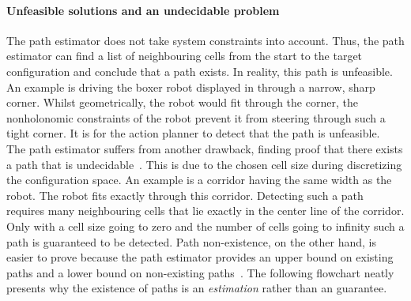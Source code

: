 \paragraph{Unfeasible solutions and an undecidable problem}
The path estimator does not take system constraints into account. Thus, the path estimator can find a list of neighbouring cells from the start to the target configuration and conclude that a path exists. In reality, this path is unfeasible. An example is driving the boxer robot displayed in  through a narrow, sharp corner. Whilst geometrically, the robot would fit through the corner, the nonholonomic constraints of the robot prevent it from steering through such a tight corner. It is for the action planner to detect that the path is unfeasible.\\

The path estimator suffers from another drawback, finding proof that there exists a path that is undecidable~\cite{zhang_simple_2008}. This is due to the chosen cell size during discretizing the configuration space. An example is a corridor having the same width as the robot. The robot fits exactly through this corridor. Detecting such a path requires many neighbouring cells that lie exactly in the center line of the corridor. Only with a cell size going to zero and the number of cells going to infinity such a path is guaranteed to be detected. Path non-existence, on the other hand, is easier to prove because the path estimator provides an upper bound on existing paths and a lower bound on non-existing paths~\cite{zhang_simple_2008}. The following flowchart neatly presents why the existence of paths is an \textit{estimation} rather than an guarantee.\bs

